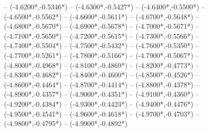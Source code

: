 {	-- ({-4.6200*\dx},{-0.5346*\dy})
	-- ({-4.6300*\dx},{-0.5427*\dy})
	-- ({-4.6400*\dx},{-0.5500*\dy})
	-- ({-4.6500*\dx},{-0.5562*\dy})
	-- ({-4.6600*\dx},{-0.5611*\dy})
	-- ({-4.6700*\dx},{-0.5648*\dy})
	-- ({-4.6800*\dx},{-0.5670*\dy})
	-- ({-4.6900*\dx},{-0.5678*\dy})
	-- ({-4.7000*\dx},{-0.5671*\dy})
	-- ({-4.7100*\dx},{-0.5650*\dy})
	-- ({-4.7200*\dx},{-0.5615*\dy})
	-- ({-4.7300*\dx},{-0.5566*\dy})
	-- ({-4.7400*\dx},{-0.5504*\dy})
	-- ({-4.7500*\dx},{-0.5432*\dy})
	-- ({-4.7600*\dx},{-0.5350*\dy})
	-- ({-4.7700*\dx},{-0.5261*\dy})
	-- ({-4.7800*\dx},{-0.5166*\dy})
	-- ({-4.7900*\dx},{-0.5067*\dy})
	-- ({-4.8000*\dx},{-0.4968*\dy})
	-- ({-4.8100*\dx},{-0.4869*\dy})
	-- ({-4.8200*\dx},{-0.4773*\dy})
	-- ({-4.8300*\dx},{-0.4682*\dy})
	-- ({-4.8400*\dx},{-0.4600*\dy})
	-- ({-4.8500*\dx},{-0.4526*\dy})
	-- ({-4.8600*\dx},{-0.4464*\dy})
	-- ({-4.8700*\dx},{-0.4414*\dy})
	-- ({-4.8800*\dx},{-0.4378*\dy})
	-- ({-4.8900*\dx},{-0.4357*\dy})
	-- ({-4.9000*\dx},{-0.4351*\dy})
	-- ({-4.9100*\dx},{-0.4360*\dy})
	-- ({-4.9200*\dx},{-0.4384*\dy})
	-- ({-4.9300*\dx},{-0.4423*\dy})
	-- ({-4.9400*\dx},{-0.4476*\dy})
	-- ({-4.9500*\dx},{-0.4541*\dy})
	-- ({-4.9600*\dx},{-0.4618*\dy})
	-- ({-4.9700*\dx},{-0.4703*\dy})
	-- ({-4.9800*\dx},{-0.4795*\dy})
	-- ({-4.9900*\dx},{-0.4892*\dy})
}

